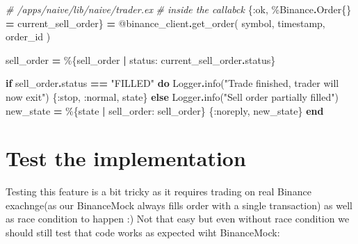 \documentclass[
]{book}
\newenvironment{Shaded}{\begin{snugshade}}{\end{snugshade}}
\newcommand{\CommentTok}[1]{\textcolor[rgb]{0.56,0.35,0.01}{\textit{#1}}}
\newcommand{\ConstantTok}[1]{\textcolor[rgb]{0.00,0.00,0.00}{#1}}
\newcommand{\ControlFlowTok}[1]{\textcolor[rgb]{0.13,0.29,0.53}{\textbf{#1}}}
\newcommand{\KeywordTok}[1]{\textcolor[rgb]{0.13,0.29,0.53}{\textbf{#1}}}
\newcommand{\NormalTok}[1]{#1}
\newcommand{\OperatorTok}[1]{\textcolor[rgb]{0.81,0.36,0.00}{\textbf{#1}}}
\newcommand{\OtherTok}[1]{\textcolor[rgb]{0.56,0.35,0.01}{#1}}
\newcommand{\StringTok}[1]{\textcolor[rgb]{0.31,0.60,0.02}{#1}}
\newcommand{\VariableTok}[1]{\textcolor[rgb]{0.00,0.00,0.00}{#1}}
\begin{document}
\begin{Shaded}
\begin{Highlighting}[]
    \CommentTok{\# /apps/naive/lib/naive/trader.ex}
    \CommentTok{\# inside the callabck}
\NormalTok{    \{}\VariableTok{:ok}\NormalTok{, \%}\ConstantTok{Binance}\OperatorTok{.}\ConstantTok{Order}\NormalTok{\{\} }\OperatorTok{=}\NormalTok{ current\_sell\_order\} }\OperatorTok{=}
      \OtherTok{@binance\_client}\OperatorTok{.}\NormalTok{get\_order(}
\NormalTok{        symbol,}
\NormalTok{        timestamp,}
\NormalTok{        order\_id}
\NormalTok{      )}

\NormalTok{    sell\_order }\OperatorTok{=}\NormalTok{ \%\{sell\_order }\OperatorTok{|} \VariableTok{status:}\NormalTok{ current\_sell\_order}\OperatorTok{.}\NormalTok{status\}}

    \ControlFlowTok{if}\NormalTok{ sell\_order}\OperatorTok{.}\NormalTok{status }\OperatorTok{==} \StringTok{"FILLED"} \KeywordTok{do}
      \ConstantTok{Logger}\OperatorTok{.}\NormalTok{info(}\StringTok{"Trade finished, trader will now exit"}\NormalTok{)}
\NormalTok{      \{}\VariableTok{:stop}\NormalTok{, }\VariableTok{:normal}\NormalTok{, state\}}
    \ControlFlowTok{else}
      \ConstantTok{Logger}\OperatorTok{.}\NormalTok{info(}\StringTok{"Sell order partially filled"}\NormalTok{)}
\NormalTok{      new\_state }\OperatorTok{=}\NormalTok{ \%\{state }\OperatorTok{|} \VariableTok{sell\_order:}\NormalTok{ sell\_order\}}
\NormalTok{      \{}\VariableTok{:noreply}\NormalTok{, new\_state\}}
    \KeywordTok{end}
\end{Highlighting}
\end{Shaded}

\hypertarget{test-the-implementation-1}{%
\section{Test the implementation}\label{test-the-implementation-1}}

Testing this feature is a bit tricky as it requires trading on real Binance exachnge(as our BinanceMock always fills order with a single transaction) as well as race condition to happen :) Not that easy but even without race condition we should still test that code works as expected wiht BinanceMock:
\end{document}
